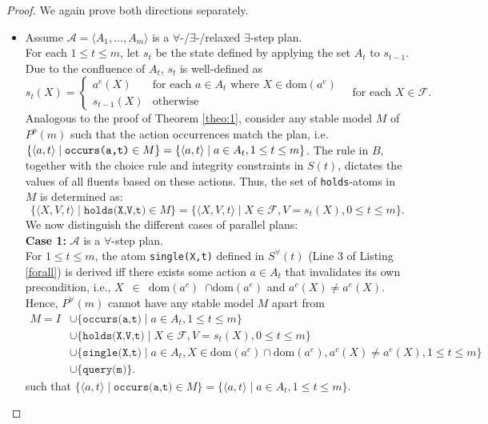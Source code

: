 \documentclass[
     11pt,                    %
     a4paper,             %
     BCOR=10mm,     %
     DIV=14,                 %
     listof=totoc,                    %
     bibliography=totoc,       %
     index=totoc,              %
     parskip            %
     twoside,
     headsepline
     ]{scrreprt}
\theoremstyle{definition}
\theoremstyle{definition}
\theoremstyle{remark}
\theoremstyle{bfnote}
\newcommand{\dom}{\mathrm{dom}}
\begin{document}
\begin{proof}
  We again prove both directions separately.
  \begin{itemize}
    \item[($\Rightarrow$):]
      Assume $\mathcal A = \langle A_1, \dots, A_m \rangle$ is a $\forall$-/$\exists$-/relaxed $\exists$-step plan. \\
      For each $1 \le t \le m$, let $s_t$ be the state defined by applying the set $A_t$ to $s_{t-1}$. Due to the confluence of $A_t$, $s_t$ is well-defined as
      \[
        s_t(X) = \begin{cases} 
          a^e(X) & \text{for each } a \in A_t \text{ where } X \in \dom(a^e) \\ 
          s_{t-1}(X) & \text{otherwise}
        \end{cases} \quad \text{for each } X \in \mathcal F.
      \]
      Analogous to the proof of Theorem \ref{theo:1}, consider any stable model $M$ of $P^p(m)$ such that the action occurrences match the plan, i.e. $\{\langle a, t \rangle \mid \texttt{occurs(a,t)} \in M\} = \{\langle a,t \rangle \mid \text{\mbox{$a \in A_t$}}, \text{\mbox{$1 \le t \le m$}} \}$.
      The rule in $B$, together with the choice rule and integrity constraints in $S(t)$, dictates the values of all fluents based on these actions. Thus, the set of \texttt{holds}-atoms in $M$ is determined as:
      \[
        \{\langle X,V,t\rangle \mid \texttt{holds(X,V,t)} \in M\} = \{\langle X,V,t\rangle \mid X \in \mathcal F, V = s_t(X), 0 \le t \le m\}.
      \]
      We now distinguish the different cases of parallel plans: \\


      \textbf{Case 1:} $\mathcal A$ is a $\forall$-step plan. \\
      For $1 \le t \le m$, the atom \texttt{single(X,t)} defined in $S^\forall(t)$ (Line 3 of Listing \ref{forall}) is derived iff there exists some action $a \in A_t$ that invalidates its own precondition, i.e., $X$~$\in$~$\dom(a^c)$~$\cap \dom(a^e)$ and $a^c(X) \ne a^e(X)$. 
      Hence, $P^\forall(m)$ cannot have any stable model $M$ apart from
      \begin{align*}
        M = I &\cup \{\texttt{occurs(a,t)} \mid a \in A_t, 1 \le t \le m\} \\
              &\cup \{\texttt{holds(X,V,t)} \mid X \in \mathcal F, V = s_t(X), 0 \le t \le m\} \\
              &\cup \{\texttt{single(X,t)} \mid a \in A_t, X \in \dom(a^c) \cap \dom(a^e), a^c(X) \ne a^e(X), 1 \le t \le m \} \\
              &\cup \{\texttt{query(m)}\}.
      \end{align*}
      such that $\{\langle a, t \rangle \mid \texttt{occurs(a,t)} \in M\} = \{\langle a, t \rangle \mid a \in A_t, 1 \le t \le m\}$.
      

\end{itemize}
\end{proof}
\end{document}
